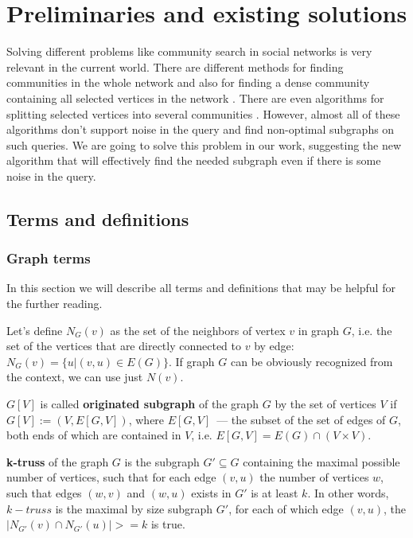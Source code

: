 \chapter{Preliminaries and existing solutions}

\startrelatedwork

Solving different problems like community search in social networks is very relevant in the current world. There are different methods for finding communities in the whole network \cite{Newman04, Newman06, Fortunato10, Cui13} and also for finding a dense community containing all selected vertices in the network \cite{Faloutsos06, Wiener15, Huang15, Barbieri15}. There are even algorithms for splitting selected vertices into several communities \cite{Akoglu13, Bian18}. However, almost all of these algorithms don't support noise in the query and find non-optimal subgraphs on such queries. We are going to solve this problem in our work, suggesting the new algorithm that will effectively find the needed subgraph even if there is some noise in the query.

\section{Terms and definitions}

\subsection{Graph terms}

In this section we will describe all terms and definitions that may be helpful for the further reading.

Let's define \textbf{$N_G(v)$} as the set of the neighbors of vertex $v$ in graph $G$, i.e. the set of the vertices that are directly connected to $v$ by edge: $N_G(v) = \{u | (v, u) \in E(G)\}$. If graph $G$ can be obviously recognized from the context, we can use just $N(v)$.

\textbf{$G[V]$} is called \textbf{originated subgraph} of the graph $G$ by the set of vertices $V$ if $G[V] := (V, E[G, V])$, where $E[G, V]$~--- the subset of the set of edges of $G$, both ends of which are contained in $V$, i.e. $E[G, V] = E(G) \cap (V \times V)$.

\textbf{k-truss} of the graph $G$ is the subgraph $G' \subseteq G$ containing the maximal possible number of vertices, such that for each edge $(v, u)$ the number of vertices $w$, such that edges $(w, v)$ and $(w, u)$ exists in $G'$ is at least $k$. In other words, $k-truss$ is the maximal by size subgraph $G'$, for each of which edge $(v, u)$, the $|N_{G'}(v) \cap N_{G'}(u)| >= k$ is true.

